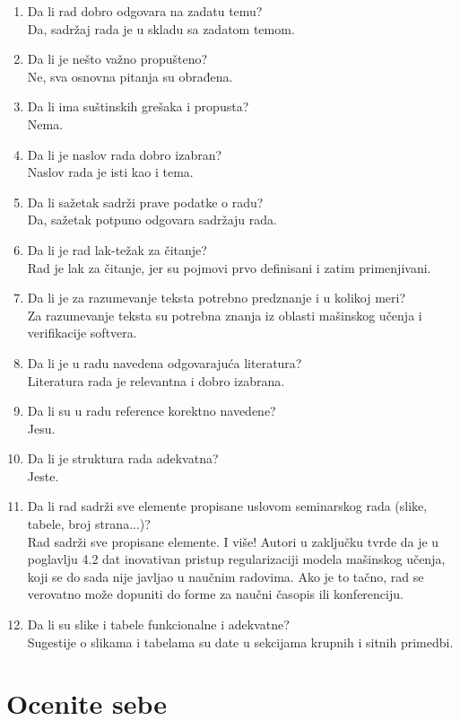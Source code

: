 \documentclass[a4paper]{report}
\begin{document}
\begin{enumerate}
\item Da li rad dobro odgovara na zadatu temu?\\Da, sadržaj rada je u skladu sa zadatom temom.
\item Da li je nešto važno propušteno?\\Ne, sva osnovna pitanja su obrađena.
\item Da li ima suštinskih grešaka i propusta?\\Nema.
\item Da li je naslov rada dobro izabran?\\Naslov rada je isti kao i tema.
\item Da li sažetak sadrži prave podatke o radu?\\Da, sažetak potpuno odgovara sadržaju rada.
\item Da li je rad lak-težak za čitanje?\\Rad je lak za čitanje, jer su pojmovi prvo definisani i zatim primenjivani.
\item Da li je za razumevanje teksta potrebno predznanje i u kolikoj meri?\\Za razumevanje teksta su potrebna znanja iz oblasti mašinskog učenja i verifikacije softvera.
\item Da li je u radu navedena odgovarajuća literatura?\\Literatura rada je relevantna i dobro izabrana.
\item Da li su u radu reference korektno navedene?\\Jesu.
\item Da li je struktura rada adekvatna?\\Jeste.
\item Da li rad sadrži sve elemente propisane uslovom seminarskog rada (slike, tabele, broj strana...)?\\Rad sadrži sve propisane elemente. I više! Autori u zaključku tvrde da je u poglavlju 4.2 dat inovativan pristup regularizaciji modela mašinskog učenja, koji se do sada nije javljao u naučnim radovima. Ako je to tačno, rad se verovatno može dopuniti do forme za naučni časopis ili konferenciju.
\item Da li su slike i tabele funkcionalne i adekvatne?\\Sugestije o slikama i tabelama su date u sekcijama krupnih i sitnih primedbi.
\end{enumerate}

\section{Ocenite sebe}
\end{document}
